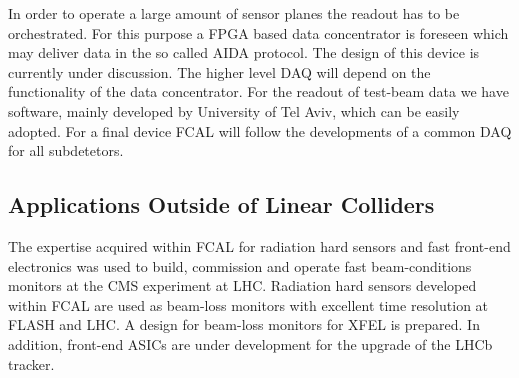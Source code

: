 In order to operate a large amount of sensor planes the readout has to be orchestrated.
For this purpose a FPGA based data concentrator is foreseen
which may deliver data in the so called AIDA protocol. The design of this device is currently under discussion.
The higher level DAQ will depend on the functionality of the data concentrator.
For the readout of test-beam data we have software, mainly developed by University of Tel Aviv,
which can be easily adopted.
For a final device FCAL will follow the developments of a common DAQ for all subdetetors.


\subsection{Applications Outside of Linear Colliders}

The expertise acquired within FCAL for radiation hard sensors and fast front-end electronics was
used to build, commission and operate fast
beam-conditions monitors at the CMS experiment at LHC.
Radiation hard sensors developed within FCAL are used as beam-loss monitors
with excellent time resolution at FLASH and LHC. A design for beam-loss monitors for XFEL is prepared.
In addition, front-end ASICs are under development for the upgrade of the LHCb tracker.

